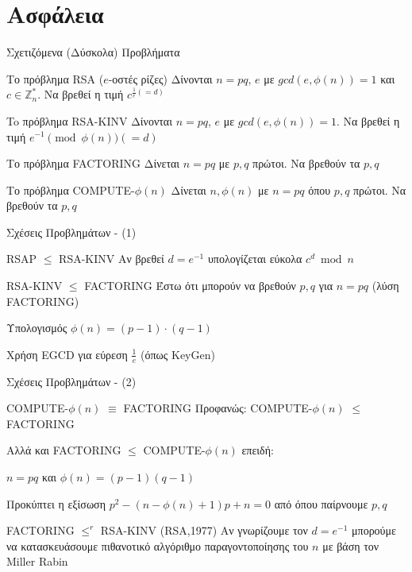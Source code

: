 \documentclass[handout]{beamer}
\begin{document}
\section{Ασφάλεια}
\begin{frame}{Σχετιζόμενα (Δύσκολα) Προβλήματα}
\begin{block}{Το πρόβλημα RSA ($e$-οστές ρίζες)}
Δίνονται  $n=pq$, $e$ με $gcd(e,\phi(n))=1$ και $c \in \mathbb{Z}_{n}^*$.
Να βρεθεί η τιμή $c^{\frac{1}{e}(=d)}$
\end{block}
\pause
\begin{block}{To πρόβλημα RSA-KINV}
Δίνονται  $n=pq$, $e$ με $gcd(e,\phi(n))=1$.
Να βρεθεί η τιμή $ e^{-1} \pmod {\phi(n)} (=d)$
\end{block}
\pause
\begin{block}{Το πρόβλημα FACTORING}
Δίνεται $n=pq$ με $p,q$ πρώτοι. Να βρεθούν τα $p,q$
\end{block}
\pause
\begin{block}{Το πρόβλημα COMPUTE-$\phi(n)$}
Δίνεται $n, \phi(n)$ με $n = pq$ όπου $p,q$ πρώτοι.
Να βρεθούν τα $p,q$
\end{block}
\end{frame}

\begin{frame}{Σχέσεις Προβλημάτων - (1)}

\begin{block}{RSAP $\leq$ RSA-KINV}
Αν βρεθεί $d=e^{-1}$ υπολογίζεται εύκολα $c^d \bmod n$ 
\end{block}
\pause
\begin{block}{RSA-KINV $\leq$ FACTORING}
Έστω ότι μπορούν να βρεθούν $p,q$ για $n=pq$ (λύση FACTORING)

Υπολογισμός $\phi(n) = (p-1) \cdot (q-1)$

Χρήση EGCD για εύρεση $\frac{1}{e}$ (όπως KeyGen)
\end{block}
\end{frame}

\begin{frame}{Σχέσεις Προβλημάτων - (2)}
\begin{block}{COMPUTE-$\phi(n)$ $\equiv$ FACTORING}
Προφανώς: COMPUTE-$\phi(n)$ $\leq$ FACTORING

Αλλά και FACTORING $\leq$ COMPUTE-$\phi(n)$ επειδή:

$n=pq$ και $\phi(n) = (p-1)(q-1)$

Προκύπτει η εξίσωση $p^2 - (n- \phi(n) +1)p + n=0$ από όπου παίρνουμε $p,q$
\end{block}

\begin{block}{FACTORING $\leq^r$ RSA-KINV (RSA,1977)} 
Αν γνωρίζουμε τον $d=e^{-1}$ μπορούμε να κατασκευάσουμε πιθανοτικό αλγόριθμο παραγοντοποίησης του  $n$ με βάση τον Miller Rabin
\end{block}
\end{frame}
\end{document}
